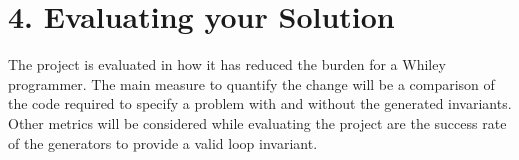 \documentclass[11pt, a4paper, twoside, openright]{report}
\begin{document}
%
%
%
%

\section*{4. Evaluating your Solution}



The project is evaluated in how it has reduced the burden for a Whiley programmer.
The main measure to quantify the change will be a comparison of the code required
to specify a problem with and without the generated invariants.
Other metrics will be considered while evaluating the project are 
the success rate of the generators to provide a valid loop invariant.
\end{document}
